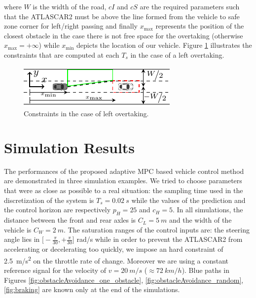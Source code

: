 where $W$ is the width of the road, $cI$ and $cS$ are the required parameters such that the ATLASCAR2 must be above the line formed from the vehicle to safe zone corner for left/right passing and finally $x_{\max}$ represents the position of the closest obstacle in the case there is not free space for the overtaking (otherwise $x_{\max}=+\infty$) while $x_{\min}$ depicts the location of our vehicle. Figure \ref{fig:constraint} illustrates the constraints that are computed at each $T_s$ in the case of a left overtaking.
\begin{figure}[!h]
	\centering
	\includegraphics[width=\textwidth]{../figure/constraint/constraint.pdf}
	\caption{Constraints in the case of left overtaking.}
	\label{fig:constraint}
\end{figure}

\section{Simulation Results}
The performances of the proposed adaptive MPC based vehicle control method are demonstrated in three simulation examples. We tried to choose parameters that were as close as possible to a real situation: the sampling time used in the discretization of the system is $T_s=\SI{0.02}{s}$ while the values of the prediction and the control horizon are respectively $p_H=25$ and $c_H=5$. In all simulations, the distance between the front and rear axles is $C_L=\SI{5}{m}$ and the width of the vehicle is $C_W=\SI{2}{m}$. The saturation ranges of the control inputs are: the steering angle lies in $\big[-\frac{\pi}{30}, +\frac{\pi}{30}\big]$ rad/s while in order to prevent the ATLASCAR2 from accelerating or decelerating too quickly, we impose an hard constraint of \SI{2.5}{m/s^2} on the throttle rate of change. Moreover we are using a constant reference signal for the velocity of $v=\SI{20}{m/s}$ ($\approx\SI{72}{km/h}$).
Blue paths in Figures \ref{fig:obstacleAvoidance_one_obstacle}, \ref{fig:obstacleAvoidance_random}, \ref{fig:braking} are known only at the end of the simulations.


